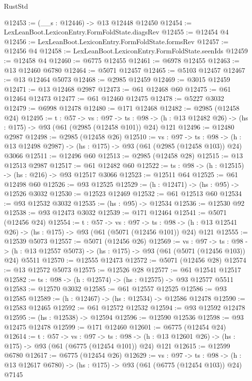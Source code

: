 \begin{lexlean}{RustStd}
\begin{coremodule}
@12453 := (__s : @12446) -> @13 @12448 @12450
@12454 := LexLeanBoot.LexiconEntry.FormFoldState.diagsRev
@12455 := @12454 @4
@12456 := LexLeanBoot.LexiconEntry.FormFoldState.formsRev
@12457 := @12456 @4
@12458 := LexLeanBoot.LexiconEntry.FormFoldState.seenIds
@12459 := @12458 @4
@12460 := @6775 @12455
@12461 := @6978 @12455
@12463 := @13 @12460 @6780
@12464 := @5071 @12457
@12465 := @5103 @12457
@12467 := @13 @12464 @5073
@12468 := @2985 @12459
@12469 := @3015 @12459
@12471 := @13 @12468 @2987
@12473 := @61 @12468 @60
@12475 := @61 @12464 @12473
@12477 := @61 @12460 @12475
@12478 := @5227 @3032
@12479 := @6998 @12478
@12480 := @171 @12468
@12482 := @2985 (@12458 @24)
@12495 := {t : @57} ->
  {vs : @97} ->
  {ts : @98} -> (h : @13 @12482 @26) -> (hs : @175) -> @93 (@61 (@2985 (@12458 @101)) @24) @121
@12496 := @12480 @2987
@12498 := @2985 (@12458 @26)
@12510 := {vs : @97} ->
  {ts : @98} -> (h : @13 @12498 @2987) -> (hs : @175) -> @93 (@61 (@2985 (@12458 @103)) @24) @3066
@12511 := @12496 @60
@12513 := @2985 (@12458 @28)
@12515 := @13 @12513 @2987
@12517 := @61 @12482 @60
@12522 := {ts : @98} -> (h : @12515) -> (hs : @216) -> @93 @12517 @3066
@12523 := @12511 @64
@12525 := @61 @12498 @60
@12526 := @93 @12525
@12529 := (h : @12471) -> (hs : @95) -> @12526 @3032
@12530 := @12523 @12469
@12532 := @61 @12513 @60
@12534 := @93 @12532 @3032
@12535 := (hs : @95) -> @12534
@12536 := @12530 @92
@12538 := @93 @12473 @3032
@12539 := @171 @12464
@12541 := @5071 (@12456 @24)
@12554 := {t : @57} ->
  {vs : @97} ->
  {ts : @98} -> (h : @13 @12541 @26) -> (hs : @175) -> @93 (@61 (@5071 (@12456 @101)) @24) @121
@12555 := @12539 @5073
@12557 := @5071 (@12456 @26)
@12569 := {vs : @97} ->
  {ts : @98} -> (h : @13 @12557 @5073) -> (hs : @175) -> @93 (@61 (@5071 (@12456 @103)) @24) @5511
@12570 := @12555 @12473
@12572 := @5071 (@12456 @28)
@12574 := @13 @12572 @5073
@12575 := @12526 @28
@12577 := @61 @12541 @12517
@12582 := {ts : @98} -> (h : @12574) -> (hs : @12575) -> @93 @12577 @5511
@12583 := @12570 @3032
@12585 := @61 @12557 @12525
@12586 := @93 @12585
@12589 := (h : @12467) -> (hs : @12534) -> @12586 @12478
@12590 := @12583 @12465
@12592 := @61 @12572 @12532
@12594 := @93 @12592 @12478
@12595 := (hs : @12538) -> @12594
@12596 := @12590 @12536
@12598 := @93 @12475 @12478
@12599 := @171 @12460
@12601 := @6775 (@12454 @24)
@12614 := {t : @57} ->
  {vs : @97} ->
  {ts : @98} -> (h : @13 @12601 @26) -> (hs : @175) -> @93 (@61 (@6775 (@12454 @101)) @24) @121
@12615 := @12599 @6780
@12617 := @6775 (@12454 @26)
@12629 := {vs : @97} ->
  {ts : @98} -> (h : @13 @12617 @6780) -> (hs : @175) -> @93 (@61 (@6775 (@12454 @103)) @24) @7145

\end{coremodule}
\end{lexlean}
